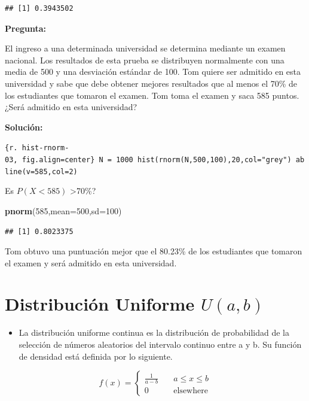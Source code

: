 \documentclass[]{book}
\newenvironment{Shaded}{\begin{snugshade}}{\end{snugshade}}
\newcommand{\KeywordTok}[1]{\textcolor[rgb]{0.13,0.29,0.53}{\textbf{#1}}}
\newcommand{\DataTypeTok}[1]{\textcolor[rgb]{0.13,0.29,0.53}{#1}}
\newcommand{\DecValTok}[1]{\textcolor[rgb]{0.00,0.00,0.81}{#1}}
\newcommand{\NormalTok}[1]{#1}
\providecommand{\tightlist}{%
  \setlength{\itemsep}{0pt}\setlength{\parskip}{0pt}}
\begin{document}
\begin{verbatim}
## [1] 0.3943502
\end{verbatim}

\textbf{Pregunta:}

El ingreso a una determinada universidad se determina mediante un examen
nacional. Los resultados de esta prueba se distribuyen normalmente con
una media de 500 y una desviación estándar de 100. Tom quiere ser
admitido en esta universidad y sabe que debe obtener mejores resultados
que al menos el 70\% de los estudiantes que tomaron el examen. Tom toma
el examen y saca 585 puntos. ¿Será admitido en esta universidad?

\textbf{Solución:}

\texttt{\{r.\ hist-rnorm-03,\ fig.align=\textquotesingle{}center\textquotesingle{}\}\ N\ =\ 1000\ hist(rnorm(N,500,100),20,col="grey")\ abline(v=585,col=2)}

Es \(P(X<585)\) \textgreater{}70\%?

\begin{Shaded}
\begin{Highlighting}[]
\KeywordTok{pnorm}\NormalTok{(}\DecValTok{585}\NormalTok{,}\DataTypeTok{mean=}\DecValTok{500}\NormalTok{,}\DataTypeTok{sd=}\DecValTok{100}\NormalTok{)}
\end{Highlighting}
\end{Shaded}

\begin{verbatim}
## [1] 0.8023375
\end{verbatim}

Tom obtuvo una puntuación mejor que el 80.23\% de los estudiantes que
tomaron el examen y será admitido en esta universidad.

\section{\texorpdfstring{Distribución Uniforme
\(U(a,b)\)}{Distribución Uniforme U(a,b)}}\label{distribuciuxf3n-uniforme-uab}

\begin{itemize}
\tightlist
\item
  La distribución uniforme continua es la distribución de probabilidad
  de la selección de números aleatorios del intervalo continuo entre a y
  b. Su función de densidad está definida por lo siguiente.
\end{itemize}

\[
f(x) = \left\{
\begin{aligned}
\frac{1}{a-b} & \quad a \leq x \leq b\\
0 ~~~~&\quad  \mbox{elsewhere}
\end{aligned}\right.
\]
\end{document}
